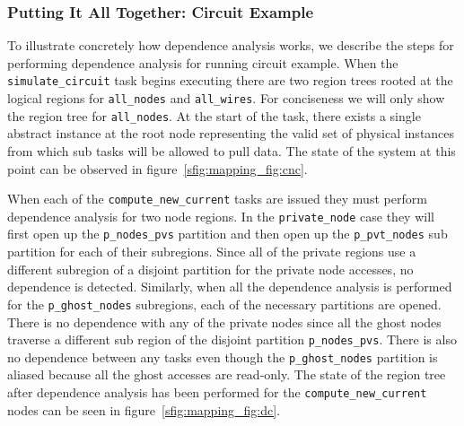 \subsubsection{Putting It All Together: Circuit Example}
\label{subsec:cirdependence}
To illustrate concretely how dependence analysis works, we describe the steps for
performing dependence analysis for running circuit example.  When the {\tt simulate\_circuit}
task begins executing there are two region trees rooted at the logical
regions for {\tt all\_nodes} and {\tt all\_wires}.  For conciseness we will only
show the region tree for {\tt all\_nodes}.  At the start of the task, there exists
a single abstract instance at the root node representing the valid set of physical
instances from which sub tasks will be allowed to pull data.  The state of the
system at this point can be observed in figure~\ref{sfig:mapping_fig:cnc}.

When each of the {\tt compute\_new\_current} tasks are issued they must perform dependence
analysis for two node regions.  In the {\tt private\_node} case they will first open
up the {\tt p\_nodes\_pvs} partition and then open up the {\tt p\_pvt\_nodes} sub partition
for each of their subregions.  Since all of the private regions use a different subregion
of a disjoint partition for the private node accesses, no dependence is detected.  Similarly,
when all the dependence analysis is performed for the {\tt p\_ghost\_nodes} subregions,
each of the necessary partitions are opened.  There is no dependence with any of the private
nodes since all the ghost nodes traverse a different sub region of the disjoint partition
{\tt p\_nodes\_pvs}.  There is also no dependence between any tasks even though the
{\tt p\_ghost\_nodes} partition is aliased because all the ghost accesses are read-only.
The state of the region tree after dependence analysis has been performed for the
{\tt compute\_new\_current} nodes can be seen in figure~\ref{sfig:mapping_fig:dc}.

